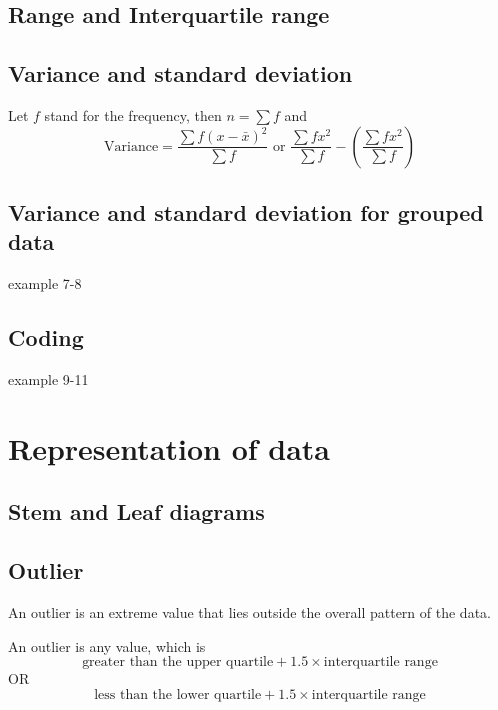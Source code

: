 \documentclass[a4paper]{article}
\begin{document}
\subsection{Range and Interquartile range}

\begin{eg}

\end{eg}

\subsection{Variance and standard deviation}
\begin{defi}[Variance]
	Let $f$ stand for the frequency, then $n=\sum f$ and
	\[
		\text{Variance}=\frac{\sum f(x-\bar{x})^2}{\sum f} \mbox{~or~} \frac{\sum fx^2}{\sum f}-(\frac{\sum fx^2}{\sum f})
	\]
\end{defi}

\subsection{Variance and standard deviation for grouped data}
\begin{defi}

\end{defi}

\begin{eg}
	example 7-8
\end{eg}

\subsection{Coding}

\begin{eg}
	example 9-11
\end{eg}

\section{Representation of data}

\subsection{Stem and Leaf diagrams}

\subsection{Outlier}
\begin{defi}
	An outlier is an extreme value that lies outside the overall pattern of the data.
\end{defi}
An outlier is any value, which is
\[
	\text{greater than the upper quartile} + 1.5 \times \text{interquartile range}
\]
OR
\[
	\text{less than the lower quartile} + 1.5 \times \text{interquartile range}
\]
\end{document}
